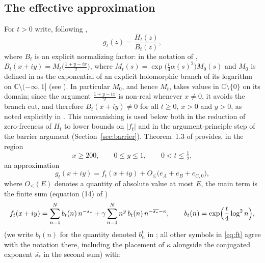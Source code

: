 \documentclass[11pt]{article}
\theoremstyle{definition}
\newcommand{\C}{\mathbb{C}}
\begin{document}
\subsection{The effective approximation}\label{sec:thm13}

For $t>0$ write, following \cite{Polymath},
\begin{equation}\label{eq:gt}
g_t(z)=\frac{H_t(z)}{B_t(z)},
\end{equation}
where $B_t$ is an explicit normalizing factor: in the notation of
\cite{Polymath}, $B_t(x+iy)=M_t\bigl(\frac{1+y-ix}{2}\bigr)$, where
$M_t(s)=\exp\bigl(\frac t4\alpha(s)^2\bigr)M_0(s)$ and $M_0$ is
defined in \cite[(6)]{Polymath} as the exponential of an explicit
holomorphic branch of its logarithm on $\C\setminus(-\infty,1]$
(see \cite[(7)]{Polymath}). In particular $M_0$, and hence $M_t$,
takes values in $\C\setminus\{0\}$ on its domain; since the argument
$\frac{1+y-ix}{2}$ is non-real whenever $x\neq0$, it avoids the
branch cut, and therefore $B_t(x+iy)\neq0$ for all $t\ge0$, $x>0$ and
$y>0$, as noted explicitly in \cite[\S1, after (11)]{Polymath}. This
nonvanishing is used below both in the reduction of zero-freeness of
$H_t$ to lower bounds on $|f_t|$ and in the argument-principle step
of the barrier argument (Section~\ref{sec:barrier}).
Theorem~1.3 of \cite{Polymath} provides, in the region
\begin{equation}\label{eq:region}
x\ge200,\qquad 0\le y\le1,\qquad 0<t\le\tfrac12,
\end{equation}
an approximation
\begin{equation}\label{eq:thm13}
g_t(x+iy)=f_t(x+iy)+O_{\le}\bigl(e_A+e_B+e_{C,0}\bigr),
\end{equation}
where $O_\le(E)$ denotes a quantity of absolute value at most $E$, the
main term is the finite sum (equation (14) of \cite{Polymath})
\begin{equation}\label{eq:ft}
f_t(x+iy)
=\sum_{n=1}^{N}b_t(n)\,n^{-s_*}
+\gamma\sum_{n=1}^{N}n^{y}\,b_t(n)\,n^{-\overline{s_*}-\kappa},
\qquad
b_t(n)=\exp\Bigl(\frac t4\log^2 n\Bigr),
\end{equation}
(we write $b_t(n)$ for the quantity denoted $b_n^t$ in
\cite{Polymath}; all other symbols in \eqref{eq:ft} agree with the
notation there, including the placement of $\kappa$ alongside the
conjugated exponent $\overline{s_*}$ in the second sum)
with:
\end{document}
